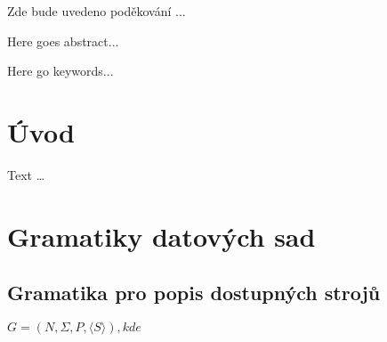 \documentclass[final]{fithesis}
\begin{document}
\FrontMatter
\ThesisTitlePage

\begin{ThesisDeclaration}
\DeclarationText
\AdvisorName
\end{ThesisDeclaration}

\begin{ThesisThanks}
Zde bude uvedeno poděkování ...
\end{ThesisThanks}

\begin{ThesisAbstract}
Here goes abstract...
\end{ThesisAbstract}

\begin{ThesisKeyWords}
Here go keywords...
\end{ThesisKeyWords}

\tableofcontents
\MainMatter

\chapter{Úvod}
Text \ldots




\appendix 

\chapter{Gramatiky datových sad}

\section{Gramatika pro popis dostupných strojů}

$G = (N, \Sigma, P,  \langle S  \rangle ), kde$
\end{document}
